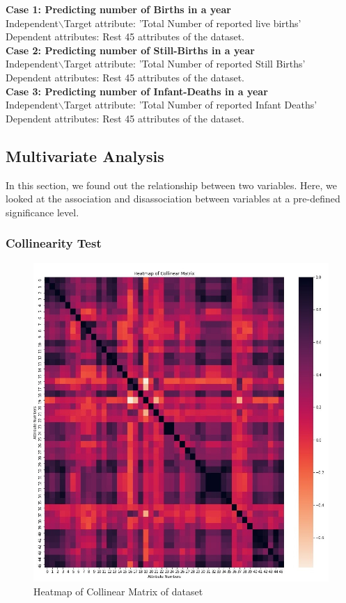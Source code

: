 \documentclass[12pt]{article}
\begin{document}
\textbf{Case 1: Predicting number of Births in a year}\\
Independent$\backslash$Target attribute: 'Total Number of reported live births'\\
Dependent attributes: Rest 45 attributes of the dataset.\\

\textbf{Case 2: Predicting number of Still-Births in a year}\\
Independent$\backslash$Target attribute: 'Total Number of reported Still Births'\\
Dependent attributes: Rest 45 attributes of the dataset.\\

\textbf{Case 3: Predicting number of Infant-Deaths in a year}\\
Independent$\backslash$Target attribute: 'Total Number of reported Infant Deaths'\\
Dependent attributes: Rest 45 attributes of the dataset.\\

\subsection{Multivariate Analysis}

In this section, we found out the relationship between two variables. Here, we looked at the association and disassociation between variables at a pre-defined significance level.

\subsubsection{Collinearity Test}

\begin{figure}[h]
	\centering
	\includegraphics[scale=0.4]{images/heatmap.jpg}
	\caption{Heatmap of Collinear Matrix of dataset}
\end{figure}
\end{document}
